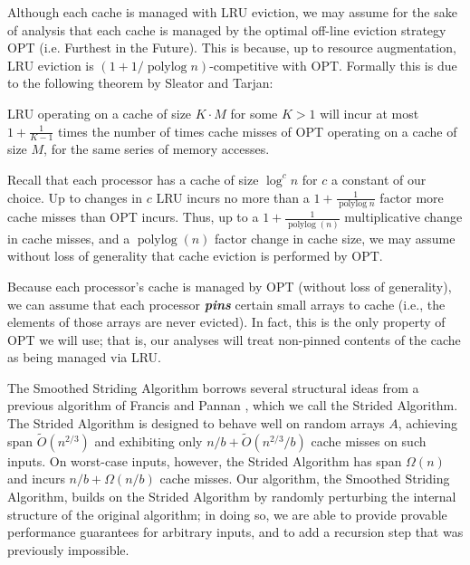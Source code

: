 \documentclass[twoside,leqno,twocolumn]{article}
\newcommand{\polylog}{\operatorname{polylog}}
\newcommand{\defn}[1]{{\textit{\textbf{\boldmath #1}}}}
\renewcommand{\paragraph}[1]{\vspace{0.09in}\noindent{\bf \boldmath #1.}}
\begin{document}
Although each cache is managed with LRU eviction, we may assume
for the sake of analysis that each cache is managed by the optimal
off-line eviction strategy OPT (i.e. Furthest in the Future). This is
because, up to resource augmentation, LRU eviction is $(1 + 1/\polylog
n)$-competitive with OPT. Formally this is due to the following
theorem by Sleator and Tarjan\cite{SleatorTa85}:
\begin{theorem}
  LRU operating on a cache of size $K\cdot M$ for some $K>1$ will incur at most
  $1+\frac{1}{K-1}$ times the number of times cache misses of OPT operating on
  a cache of size $M$, for the same series of memory accesses.
  \label{thm:augmentation}
\end{theorem}

Recall that each processor has a cache of size $\log^c n$ for $c$ a
constant of our choice.  Up to changes in $c$ LRU incurs no more than
a $1+\frac{1}{\operatorname{polylog}{n}}$ factor more cache misses
than OPT incurs. Thus, up to a $1 + \frac{1}{\polylog(n)}$
multiplicative change in cache misses, and a $\polylog(n)$ factor change in
cache size, we may assume without loss of generality that cache
eviction is performed by OPT.

Because each processor's cache is managed by OPT (without loss of
generality), we can assume that each processor \defn{pins} certain
small arrays to cache (i.e., the elements of those arrays are never
evicted). In fact, this is the only property of OPT we will use; that
is, our analyses will treat non-pinned contents of the cache as being
managed via LRU.

\paragraph{The Strided Algorithm \cite{FrancisPa92}}
The Smoothed Striding Algorithm borrows several structural ideas
from a previous algorithm of Francis and Pannan
\cite{FrancisPa92}, which we call the Strided Algorithm. The
Strided Algorithm is designed to behave well on random arrays
$A$, achieving span $\tilde{O}(n^{2/3})$ and exhibiting only $n/b
+ \tilde{O}(n^{2/3} / b)$  cache misses on such inputs. On
worst-case inputs, however, the Strided Algorithm has span
$\Omega(n)$ and incurs $n/b + \Omega(n/b)$ cache misses. Our
algorithm, the Smoothed Striding Algorithm, builds on the Strided
Algorithm by randomly perturbing the internal structure of the
original algorithm; in doing so, we are able to provide provable
performance guarantees for arbitrary inputs, and to add a
recursion step that was previously impossible.
\end{document}
